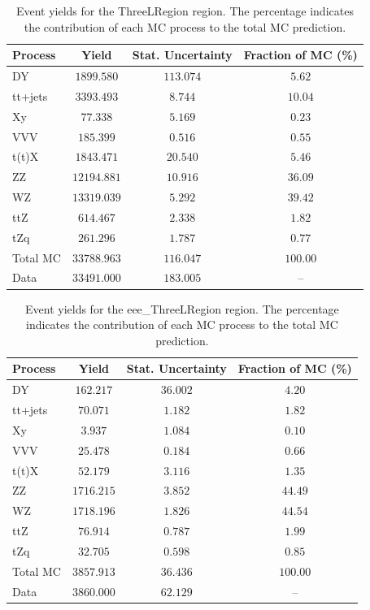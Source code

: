 \begin{table}[htbp]
\centering
\caption{Event yields for the ThreeLRegion region. The percentage indicates the contribution of each MC process to the total MC prediction.}
\label{tab:ThreeLRegion_yields}
\begin{tabular}{lccc}
\hline
Process & Yield & Stat. Uncertainty & Fraction of MC (\%) \\
\hline
DY & $1899.580$ & $113.074$ & $5.62$ \\
tt+jets & $3393.493$ & $8.744$ & $10.04$ \\
Xy & $77.338$ & $5.169$ & $0.23$ \\
VVV & $185.399$ & $0.516$ & $0.55$ \\
t(t)X & $1843.471$ & $20.540$ & $5.46$ \\
ZZ & $12194.881$ & $10.916$ & $36.09$ \\
WZ & $13319.039$ & $5.292$ & $39.42$ \\
ttZ & $614.467$ & $2.338$ & $1.82$ \\
tZq & $261.296$ & $1.787$ & $0.77$ \\
\hline
Total MC & $33788.963$ & $116.047$ & $100.00$ \\
Data & $33491.000$ & $183.005$ & -- \\
\hline
\end{tabular}
\end{table}

\begin{table}[htbp]
\centering
\caption{Event yields for the eee\_ThreeLRegion region. The percentage indicates the contribution of each MC process to the total MC prediction.}
\label{tab:eee_ThreeLRegion_yields}
\begin{tabular}{lccc}
\hline
Process & Yield & Stat. Uncertainty & Fraction of MC (\%) \\
\hline
DY & $162.217$ & $36.002$ & $4.20$ \\
tt+jets & $70.071$ & $1.182$ & $1.82$ \\
Xy & $3.937$ & $1.084$ & $0.10$ \\
VVV & $25.478$ & $0.184$ & $0.66$ \\
t(t)X & $52.179$ & $3.116$ & $1.35$ \\
ZZ & $1716.215$ & $3.852$ & $44.49$ \\
WZ & $1718.196$ & $1.826$ & $44.54$ \\
ttZ & $76.914$ & $0.787$ & $1.99$ \\
tZq & $32.705$ & $0.598$ & $0.85$ \\
\hline
Total MC & $3857.913$ & $36.436$ & $100.00$ \\
Data & $3860.000$ & $62.129$ & -- \\
\hline
\end{tabular}
\end{table}

